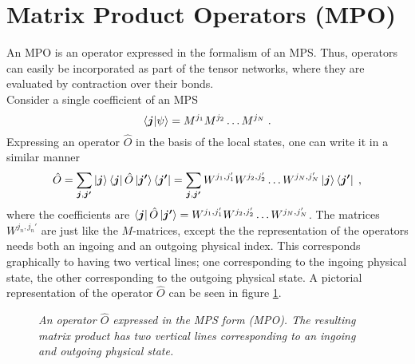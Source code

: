 \section{Matrix Product Operators (MPO)} \label{sec:MPO}
An MPO is an operator expressed in the formalism of an MPS. Thus, operators can easily be incorporated as part of the tensor networks, where they are evaluated by contraction over their bonds.\\
Consider a single coefficient of an MPS
\begin{equation}
	\braket{\boldsymbol{j} | \psi} = M^{j_1} M^{j_2} \ldots M^{j_N} \; . 
\end{equation}
Expressing an operator $\hat{O}$ in the basis of the local states, one can write it in a similar manner
\begin{equation}
	\hat{O} = \sum_{\boldsymbol{j} , \boldsymbol{j'}} \ket{\boldsymbol{j}} \bra{\boldsymbol{j}} \hat{O} \ket{\boldsymbol{j'}} \bra{\boldsymbol{j'}} = \sum_{\boldsymbol{j} , \boldsymbol{j'}} W^{j_1 , j_1 '} W^{j_2 , j_2 '} \ldots W^{j_N , j_N '} \ket{\boldsymbol{j}} \bra{\boldsymbol{j '}} \; ,
	\label{eq:MPOrep}
\end{equation}
where the coefficients are $\bra{\boldsymbol{j}} \hat{O} \ket{\boldsymbol{j'}} = W^{j_1 , j_1 '} W^{j_2 , j_2 '} \ldots W^{j_N , j_N '}$. The matrices $W^{j_n , j_n '}$ are just like the $M$-matrices, except the the representation of the operators needs both an ingoing and an outgoing physical index. This corresponds graphically to having two vertical lines; one corresponding to the ingoing physical state, the other corresponding to the outgoing physical state. A pictorial representation of the operator $\hat{O}$ can be seen in figure \ref{fig:MPOchain}.
\begin{figure}[h!]
	\centering
	
	\caption{\textit{An operator $\hat{O}$ expressed in the MPS form (MPO). The resulting matrix product has two vertical lines corresponding to an ingoing and outgoing physical state.}}
	\label{fig:MPOchain}
\end{figure}

